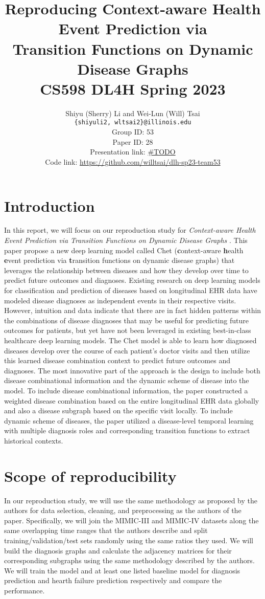 \documentclass[11pt,a4paper]{article}
\title{
  Reproducing Context-aware Health Event Prediction via \\
  Transition Functions on Dynamic Disease Graphs \cite{chet} \\
  CS598 DL4H Spring 2023
  }
\author{Shiyu (Sherry) Li and Wei-Lun (Will) Tsai \\
  \texttt{\{shiyuli2, wltsai2\}@illinois.edu}
  \\[2em]
  Group ID: 53\\
  Paper ID: 28\\
  Presentation link: \url{\#TODO} \\
  Code link: \url{https://github.com/willtsai/dlh-sp23-team53}}
\begin{document}
\maketitle


\section{Introduction}
In this report, we will focus on our reproduction study for \textit{Context-aware Health Event Prediction via Transition 
Functions on Dynamic Disease Graphs} \cite{chet}.
This paper propose a new deep learning model called Chet
(\textbf{c}ontext-aware \textbf{h}ealth \textbf{e}vent prediction via
\textbf{t}ransition functions on dynamic disease graphs) that leverages the
relationship between diseases and how they develop over time to predict future
outcomes and diagnoses. Existing research on deep learning models for
classification and prediction of diseases based on longitudinal EHR data have
modeled disease diagnoses as independent events in their respective visits.
However, intuition and data indicate that there are in fact hidden patterns
within the combinations of disease diagnoses that may be useful for predicting
future outcomes for patients, but yet have not been leveraged in existing
best-in-class healthcare deep learning models. The Chet model is able to learn
how diagnosed diseases develop over the course of each patient's doctor visits
and then utilize this learned disease combination context to predict future
outcomes and diagnoses. 
The most innovative part of the approach is the design to include both
disease combinational information and the dynamic scheme of disease into the model. To include 
disease combinational information, the paper constructed a weighted disease combination
based on the entire longitudinal EHR data globally and also a disease subgraph based on the 
specific visit locally. To include dynamic scheme of diseases, the paper utilized a disease-level
temporal learning with multiple diagnosis roles and corresponding transition functions to extract
historical contexts.

\section{Scope of reproducibility}
In our reproduction study, we will use the same methodology as proposed by the
authors for data selection, cleaning, and preprocessing as the authors of the
paper. Specifically, we will join the MIMIC-III \cite{mimic3} and MIMIC-IV
\cite{mimic4} datasets along the same overlapping time ranges that the authors
describe and split training/validation/test sets randomly using the same ratios
they used. We will build the diagnosis graphs and calculate the adjacency
matrices for their corresponding subgraphs using the same methodology described
by the authors. We will train the model and at least one listed baseline model for diagnosis prediction and hearth failure prediction respectively and compare the performance.
\end{document}
